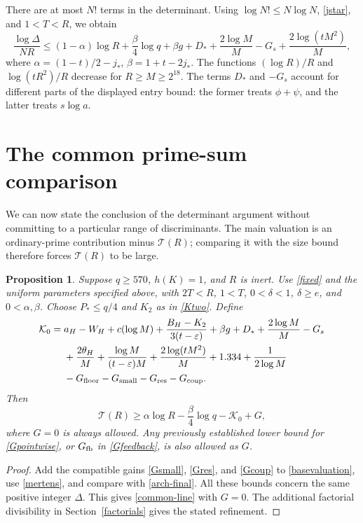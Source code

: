 \documentclass[11pt]{article}
\newtheorem{proposition}[theorem]{Proposition}
\newcommand{\Tn}{\mathcal T}
\newcommand{\eps}{\varepsilon}
\begin{document}
There are at most \(N!\) terms in the determinant. Using
\(\log N!\le N\log N\), \eqref{jstar}, and \(1<T<R\), we obtain
\begin{equation}\label{arch-final}
 \frac{\log\Delta}{NR}\le
 (1-\alpha)\log R+\frac\beta4\log q+\beta g
       +D_*+\frac{2\log M}{M}-G_s+\frac{2\log(tM^2)}M,
\end{equation}
where
\(\alpha=(1-t)/2-j_*\), \(\beta=1+t-2j_*\).
The functions \((\log R)/R\) and \(\log(tR^2)/R\) decrease for \(R\ge M\ge2^{18}\). The terms \(D_*\) and \(-G_s\) account for different
parts of the displayed entry bound: the former treats
\(\phi+\psi\), and the latter treats \(s\log a\).

\section{The common prime-sum comparison}\label{comparison}
We can now state the conclusion of the determinant argument without
committing to a particular range of discriminants. The main valuation
is an ordinary-prime contribution minus \(\Tn(R)\); comparing it
with the size bound therefore forces \(\Tn(R)\) to be large.

\begin{proposition}\label{common-proposition}
Suppose \(q\ge570\), \(h(K)=1\), and \(R\) is inert. Use
\eqref{fixed} and the uniform parameters specified above, with
\(2T<R\), \(1<T\), \(0<\delta<1\), \(\delta\ge e\),
and \(0<\alpha,\beta\). Choose \(P_*\le q/4\) and \(K_2\)
as in \eqref{Ktwo}. Define
\begin{equation}\label{basecost}
\begin{aligned}
 \mathcal K_0={}&a_H-W_H+c(\log M)
 +\frac{B_H-K_2}{3(t-\eps)}+\beta g+D_*
 +\frac{2\log M}{M}-G_s\\
 &+\frac{2\theta_H}{M}+\frac{\log M}{(t-\eps)M}
 +\frac{2\log(tM^2)}M+1.334+\frac1{2\log M}\\
 &-G_{\rm floor}-G_{\rm small}-G_{\rm res}-G_{\rm coup}.
\end{aligned}
\end{equation}
Then
\begin{equation}\label{common-line}
 \Tn(R)\ge\alpha\log R-\frac\beta4\log q-\mathcal K_0+G,
\end{equation}
where \(G=0\) is always allowed. Any previously established lower
bound for \eqref{Gpointwise}, or \(G_{\rm fb}\) in
\eqref{Gfeedback}, is also allowed as \(G\).
\end{proposition}
\begin{proof}
Add the compatible gains \eqref{Gsmall}, \eqref{Gres}, and
\eqref{Gcoup} to \eqref{basevaluation}, use \eqref{mertens}, and
compare with \eqref{arch-final}. All these bounds concern the same
positive integer \(\Delta\). This gives \eqref{common-line} with
\(G=0\). The additional factorial divisibility in
Section~\ref{factorials} gives the stated refinement.
\end{proof}
\end{document}
